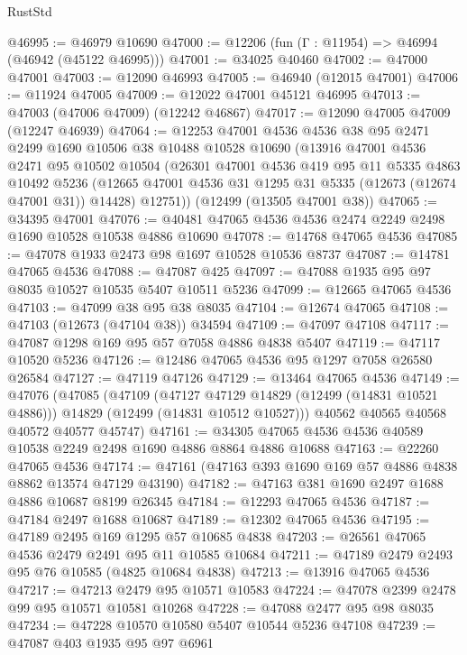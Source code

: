 \begin{lexlean}{RustStd}
\begin{coremodule}
{\begin{coremodule}
{{{{{{{{{{{{{{{{{{{{{{{{{{{{{{{{{{{{{{{{{{{{{{{{{{{{{{{{{{{{{{{{{{{{{{{{{{{{{{{{@46995 := @46979 @10690
@47000 := @12206 (fun (Γ : @11954) => @46994 (@46942 (@45122 @46995)))
@47001 := @34025 @40460
@47002 := @47000 @47001
@47003 := @12090 @46993
@47005 := @46940 (@12015 @47001)
@47006 := @11924 @47005
@47009 := @12022 @47001 @45121 @46995
@47013 := @47003 (@47006 @47009) (@12242 @46867)
@47017 := @12090 @47005 @47009 (@12247 @46939)
@47064 := @12253
    @47001
    @4536
    @4536
    @38
    @95
    @2471
    @2499
    @1690
    @10506
    @38
    @10488
    @10528
    @10690
    (@13916
      @47001
      @4536
      @2471
      @95
      @10502
      @10504
      (@26301
        @47001
        @4536
        @419
        @95
        @11
        @5335
        @4863
        @10492
        @5236
        (@12665 @47001 @4536 @31 @1295 @31 @5335 (@12673 (@12674 @47001 @31)) @14428)
        @12751))
    (@12499 (@13505 @47001 @38))
@47065 := @34395 @47001
@47076 := @40481 @47065 @4536 @4536 @2474 @2249 @2498 @1690 @10528 @10538 @4886 @10690
@47078 := @14768 @47065 @4536
@47085 := @47078 @1933 @2473 @98 @1697 @10528 @10536 @8737
@47087 := @14781 @47065 @4536
@47088 := @47087 @425
@47097 := @47088 @1935 @95 @97 @8035 @10527 @10535 @5407 @10511 @5236
@47099 := @12665 @47065 @4536
@47103 := @47099 @38 @95 @38 @8035
@47104 := @12674 @47065
@47108 := @47103 (@12673 (@47104 @38)) @34594
@47109 := @47097 @47108
@47117 := @47087 @1298 @169 @95 @57 @7058 @4886 @4838 @5407
@47119 := @47117 @10520 @5236
@47126 := @12486 @47065 @4536 @95 @1297 @7058 @26580 @26584
@47127 := @47119 @47126
@47129 := @13464 @47065 @4536
@47149 := @47076
    (@47085
      (@47109
        (@47127 @47129 @14829 (@12499 (@14831 @10521 @4886)))
        @14829
        (@12499 (@14831 @10512 @10527)))
      @40562
      @40565
      @40568
      @40572
      @40577
      @45747)
@47161 := @34305 @47065 @4536 @4536 @40589 @10538 @2249 @2498 @1690 @4886 @8864 @4886 @10688
@47163 := @22260 @47065 @4536
@47174 := @47161 (@47163 @393 @1690 @169 @57 @4886 @4838 @8862 @13574 @47129 @43190)
@47182 := @47163 @381 @1690 @2497 @1688 @4886 @10687 @8199 @26345
@47184 := @12293 @47065 @4536
@47187 := @47184 @2497 @1688 @10687
@47189 := @12302 @47065 @4536
@47195 := @47189 @2495 @169 @1295 @57 @10685 @4838
@47203 := @26561 @47065 @4536 @2479 @2491 @95 @11 @10585 @10684
@47211 := @47189 @2479 @2493 @95 @76 @10585 (@4825 @10684 @4838)
@47213 := @13916 @47065 @4536
@47217 := @47213 @2479 @95 @10571 @10583
@47224 := @47078 @2399 @2478 @99 @95 @10571 @10581 @10268
@47228 := @47088 @2477 @95 @98 @8035
@47234 := @47228 @10570 @10580 @5407 @10544 @5236 @47108
@47239 := @47087 @403 @1935 @95 @97 @6961
}}}}}}}}}}}}}}}}}}}}}}}}}}}}}}}}}}}}}}}}}}}}}}}}}}}}}}}}}}}}}}}}}}}}}}}}}}}}}}}}
\end{coremodule}}
\end{coremodule}
\end{lexlean}
